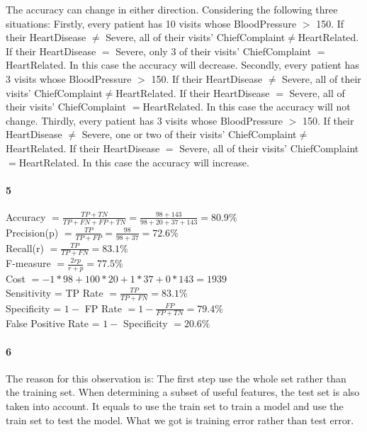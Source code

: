 \documentclass[22pt]{article}
\begin{document}
		 The accuracy can change in either direction. Considering the following three situations: Firstly, every patient has 10 visits whose BloodPressure $>$ 150. If their HeartDisease $\not=$ Severe, all of their visits' ChiefComplaint$\not=$HeartRelated. If their HeartDisease $=$ Severe, only 3 of their visits' ChiefComplaint $=$HeartRelated. In this case the accuracy will decrease. Secondly, every patient has 3 visits whose BloodPressure $>$ 150. If their HeartDisease $\not=$ Severe, all of their visits' ChiefComplaint$\not=$HeartRelated. If their HeartDisease $=$ Severe, all of their visits' ChiefComplaint $=$HeartRelated. In this case the accuracy will not change. Thirdly, every patient has 3 visits whose BloodPressure $>$ 150. If their HeartDisease $\not=$ Severe, one or two of their visits' ChiefComplaint$\not=$HeartRelated. If their HeartDisease $=$ Severe, all of their visits' ChiefComplaint $=$HeartRelated. In this case the accuracy will increase.


	\paragraph{5}
	Accuracy $=\frac{TP+TN}{TP+FN+FP+TN} = \frac{98+143}{98+20+37+143} = 80.9\%$\\[1ex]

	Precision(p) $ =\frac{TP}{TP+FP}= \frac{98}{98+37} = 72.6\%$\\[1ex]

	Recall(r) $ =\frac{TP}{TP+FN}=83.1\% $\\[1ex]

	F-measure $ = \frac{2rp}{r+p} =77.5\% $\\[1ex]

	Cost $ = -1*98 +100*20+1*37+0*143 = 1939$\\[1ex]

	Sensitivity = TP Rate $ = \frac{TP}{TP+FN}=83.1\% $\\[1ex]

	Specificity = $1 - $ FP Rate $ = 1-\frac{FP}{FP+TN} = 79.4\%$\\[1ex]

	False Positive Rate = $1-$ Specificity $ = 20.6\%$

	\paragraph{6}
	The reason for this observation is: The first step use the whole set rather than the training set. When determining a subset of useful features, the test set is also taken into account. It equals to use the train set to train a model and use the train set to test the model. What we got is training error rather than test error.
\end{document}
